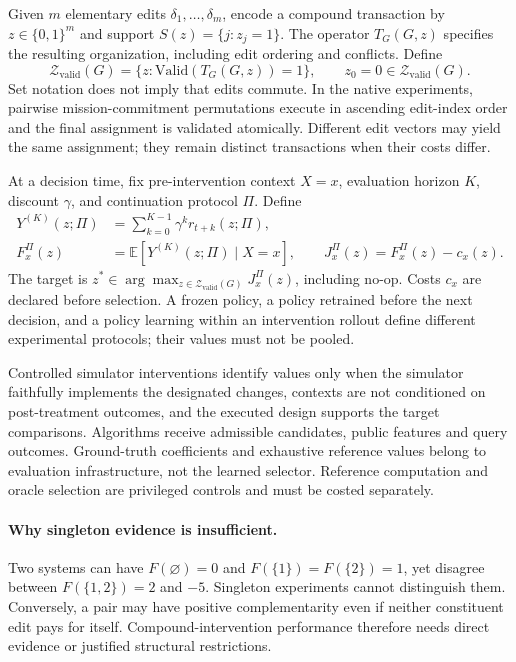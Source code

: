 \documentclass[runningheads]{llncs}
\newcommand{\valid}{\mathcal Z_{\mathrm{valid}}}
\newcommand{\noop}{z_0}
\begin{document}
Given $m$ elementary edits $\delta_1,\ldots,\delta_m$, encode a compound transaction by $z\in\{0,1\}^m$ and support $S(z)=\{j:z_j=1\}$. The operator $T_G(G,z)$ specifies the resulting organization, including edit ordering and conflicts. Define
\begin{equation}
    \valid(G)=\{z:\mathrm{Valid}(T_G(G,z))=1\},\qquad \noop=0\in\valid(G).
\end{equation}
Set notation does not imply that edits commute. In the native experiments, pairwise mission-commitment permutations execute in ascending edit-index order and the final assignment is validated atomically. Different edit vectors may yield the same assignment; they remain distinct transactions when their costs differ.

At a decision time, fix pre-intervention context $X=x$, evaluation horizon $K$, discount $\gamma$, and continuation protocol $\Pi$. Define
\begin{equation}\label{eq:estimand}
    \begin{aligned}
        Y^{(K)}(z;\Pi) & =\sum_{k=0}^{K-1}\gamma^k r_{t+k}(z;\Pi), \\
        F_x^\Pi(z)     & =\mathbb E[Y^{(K)}(z;\Pi)\mid X=x],\qquad
        J_x^\Pi(z)=F_x^\Pi(z)-c_x(z).
    \end{aligned}
\end{equation}
The target is $z^*\in\arg\max_{z\in\valid(G)}J_x^\Pi(z)$, including no-op. Costs $c_x$ are declared before selection. A frozen policy, a policy retrained before the next decision, and a policy learning within an intervention rollout define different experimental protocols; their values must not be pooled.

Controlled simulator interventions identify values only when the simulator faithfully implements the designated changes, contexts are not conditioned on post-treatment outcomes, and the executed design supports the target comparisons. Algorithms receive admissible candidates, public features and query outcomes. Ground-truth coefficients and exhaustive reference values belong to evaluation infrastructure, not the learned selector. Reference computation and oracle selection are privileged controls and must be costed separately.

\paragraph{Why singleton evidence is insufficient.}
Two systems can have $F(\varnothing)=0$ and $F(\{1\})=F(\{2\})=1$, yet disagree between $F(\{1,2\})=2$ and $-5$. Singleton experiments cannot distinguish them. Conversely, a pair may have positive complementarity even if neither constituent edit pays for itself. Compound-intervention performance therefore needs direct evidence or justified structural restrictions.
\end{document}
